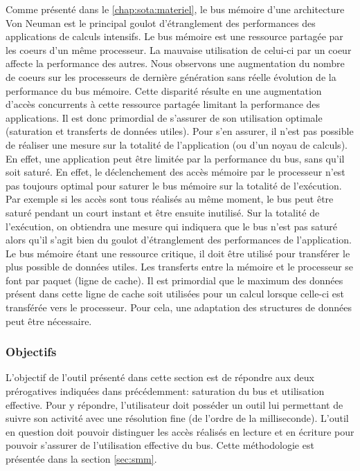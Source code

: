         Comme présenté dans le \autoref{chap:sota:materiel}, le bus mémoire d'une architecture Von Neuman est le principal goulot d'étranglement des performances des applications de calculs intensifs\cite{Drepper2007}. Le bus mémoire est une ressource partagée par les coeurs d'un même processeur. La mauvaise utilisation de celui-ci par un coeur affecte la performance des autres. Nous observons une augmentation du nombre de coeurs sur les processeurs de dernière génération sans réelle évolution de la performance du bus mémoire. Cette disparité résulte en une augmentation d'accès concurrents à cette ressource partagée limitant la performance des applications. Il est donc primordial de s'assurer de son utilisation optimale (saturation et transferts de données utiles). Pour s'en assurer, il n'est pas possible de réaliser une mesure sur la totalité de l'application (ou d'un noyau de calculs). En effet, une application peut être limitée par la performance du bus, sans qu'il soit saturé. En effet, le déclenchement des accès mémoire par le processeur n’est pas toujours optimal pour saturer le bus mémoire sur la totalité de l'exécution. Par exemple si les accès sont tous réalisés au même moment, le bus peut être saturé pendant un court instant et être ensuite inutilisé. Sur la totalité de l'exécution, on obtiendra une mesure qui indiquera que le bus n'est pas saturé alors qu'il s'agit bien du goulot d'étranglement des performances de l'application. Le bus mémoire étant une ressource critique, il doit être utilisé pour transférer le plus possible de données utiles. Les transferts entre la mémoire et le processeur se font  par paquet (ligne de cache). Il est primordial que le maximum des données présent dans cette ligne de cache soit utilisées pour un calcul lorsque celle-ci est transférée vers le processeur. Pour cela, une adaptation des structures de données peut être nécessaire.
    
    \subsubsection{Objectifs}
    
        L'objectif de l'outil présenté dans cette section est de répondre aux deux prérogatives indiquées dans précédemment: saturation du bus et utilisation effective. Pour y répondre, l'utilisateur doit posséder un outil lui permettant de suivre son activité avec une résolution fine (de l'ordre de la milliseconde). L'outil en question doit pouvoir distinguer les accès réalisés en lecture et en écriture pour pouvoir s'assurer de l'utilisation effective du bus. Cette méthodologie est présentée dans la section \autoref{sec:smm}.
        
